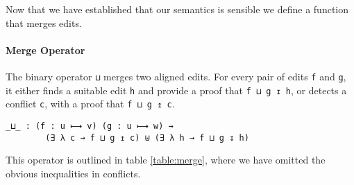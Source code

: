 \documentclass{sigplanconf}
\theoremstyle{plain}
\begin{document}
        Now that we have established that our semantics is sensible we
        define a function that merges edits.

	\paragraph{Merge Operator}
	The binary operator \texttt{⊔} merges two aligned edits.
        For every pair of edits \texttt{f} and \texttt{g}, it either
        finds a suitable edit \texttt{h} and provide a proof that
        \texttt{f ⊔ g ↧ h}, or detects a conflict \texttt{c}, with a
        proof that \texttt{f ⊔ g ↥ c}.
        
\begin{verbatim}
_⊔_ : (f : u ⟼ v) (g : u ⟼ w) →
        (∃ λ c → f ⊔ g ↥ c) ⊎ (∃ λ h → f ⊔ g ↧ h)
\end{verbatim}
	This operator is outlined in table \ref{table:merge}, where we have
        omitted the obvious inequalities in conflicts.
\end{document}
